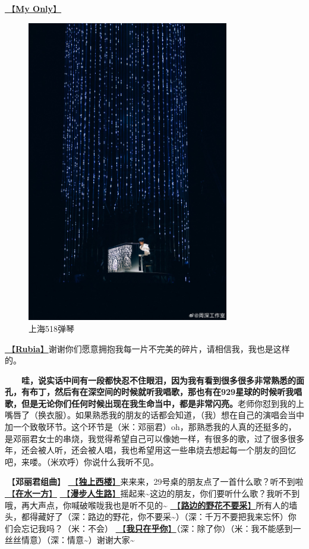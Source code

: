 \documentclass[]{ctexbook}
\begin{document}
\hyperref[my-only]{🎵【\textbf{My Only}】}

\begin{figure}

{\centering \includegraphics[width=250pt]{img/shanghai20240518/001} 

}

\caption{上海518弹琴}\label{fig:unnamed-chunk-33}
\end{figure}

\hyperref[rubia]{🎵【\textbf{Rubia}】}谢谢你们愿意拥抱我每一片不完美的碎片，请相信我，我也是这样的。

  \textbf{哇，说实话中间有一段都快忍不住眼泪，因为我有看到很多很多非常熟悉的面孔，有布丁，然后有在深空间的时候就听我唱歌，那也有在929星球的时候听我唱歌，但是无论你们任何时候出现在我生命当中，都是非常闪亮。}老师你怼到我的上嘴唇了（换衣服）。如果熟悉我的朋友的话都会知道，（我）想在自己的演唱会当中加一个致敬环节。这个环节是（米：邓丽君）oh，那熟悉我的人真的还挺多的，是邓丽君女士的串烧，我觉得希望自己可以像她一样，有很多的歌，过了很多很多年，还会被人听，还会被人唱，我也希望用这一些串烧去想起每一个朋友的回忆吧，来喽。（米欢呼）你说什么我听不见。

🎵【\textbf{邓丽君组曲}】
\hyperref[one-in-the-building]{🎵【\textbf{独上西楼}】}来来来，29号桌的朋友点了一首什么歌？听不到啦
\hyperref[on-the-water-side]{🎵【\textbf{在水一方}】}
\hyperref[walk-the-road-of-life]{🎵【\textbf{漫步人生路}】}摇起来\textasciitilde 这边的朋友，你们要听什么歌？我听不到哦，再大声点，你喊破喉咙我也是听不见的\textasciitilde{}
\hyperref[only-with-me]{🎵【\textbf{路边的野花不要采}】}所有人的墙头，都得藏好了（深：路边的野花，你不要采\textasciitilde）（深：千万不要把我来忘怀）你们会忘记我吗？（米：不会）
\hyperref[only-you]{🎵【\textbf{我只在乎你}】}（深：除了你）（米：我不能感到一丝丝情意）（深：情意\textasciitilde）谢谢大家\textasciitilde{}
\end{document}
